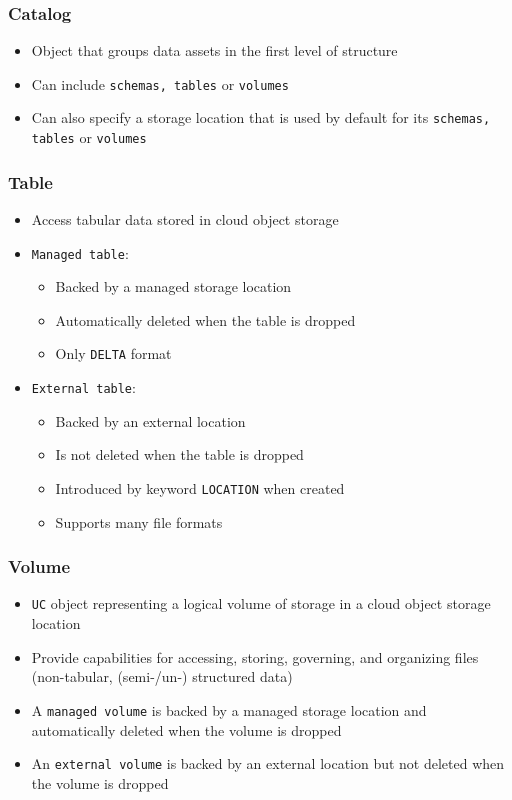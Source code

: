 \documentclass[11pt]{scrartcl}
\begin{document}
\subsubsection{Catalog} \label{catalog}
\begin{itemize}
	\item Object that groups data assets in the first level of structure
	\item Can include \texttt{schemas, tables} or \texttt{volumes}
	\item Can also specify a storage location that is used by default for its \texttt{schemas, tables} or \texttt{volumes}
\end{itemize}
	
\subsubsection{Table} \label{table}
\begin{itemize}
	\item Access tabular data stored in cloud object storage
	\item \texttt{Managed table}: 
	\begin{itemize}
		\item Backed by a managed storage location 
		\item Automatically deleted when the table is dropped
		\item Only \texttt{DELTA} format
	\end{itemize}
	\item \texttt{External table}:
	\begin{itemize}
		\item Backed by an external location 
		\item Is not deleted when the table is dropped 
		\item Introduced by keyword \texttt{LOCATION} when created
		\item Supports many file formats
	\end{itemize}
\end{itemize}

\subsubsection{Volume} \label{volume}
\begin{itemize}
	\item \texttt{UC} object representing a logical volume of storage in a cloud object storage location
	\item Provide capabilities for accessing, storing, governing, and organizing files (non-tabular, (semi-/un-) structured data)
	\item A \texttt{managed volume} is backed by a managed storage location and automatically deleted when the volume is dropped
	\item An \texttt{external volume} is backed by an external location but not deleted when the volume is dropped
\end{itemize}
\end{document}
